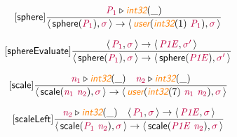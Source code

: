 \documentclass[10pt,leqno,fleqn]{article}
\newcommand{\artVariable}[1]{\mbox{\color{purple}\em #1\/}}
\newcommand{\artConstructor}[1]{\mbox{\sf #1}}
\newcommand{\artSpecial}[1]{\mbox{\color{orange}\sf\em #1}}
\begin{document}
\begin{equation}
\tag*{[\artConstructor{\sf sphere}]}
\begin{split}\frac{ \artVariable{P$_{1}$}\triangleright \artSpecial{int32}(\_) }{\langle\, \artConstructor{\sf sphere}(\artVariable{P$_{1}$}), \artVariable{$\sigma$}\,\rangle \rightarrow \langle\, \artSpecial{user}(\artSpecial{int32}(1)\ \artVariable{P$_{1}$}), \artVariable{$\sigma$}\,\rangle }
\end{split}
\end{equation}

\begin{equation}
\tag*{[\artConstructor{\sf sphereEvaluate}]}
\begin{split}\frac{\langle\, \artVariable{P$_{1}$}, \artVariable{$\sigma$}\,\rangle \rightarrow \langle\, \artVariable{P1E}, \artVariable{$\sigma$\/$^\prime$}\,\rangle }{\langle\, \artConstructor{\sf sphere}(\artVariable{P$_{1}$}), \artVariable{$\sigma$}\,\rangle \rightarrow \langle\, \artConstructor{\sf sphere}(\artVariable{P1E}), \artVariable{$\sigma$\/$^\prime$}\,\rangle }
\end{split}
\end{equation}

\begin{equation}
\tag*{[\artConstructor{\sf scale}]}
\begin{split}\frac{ \artVariable{n$_{1}$}\triangleright \artSpecial{int32}(\_) \quad  \artVariable{n$_{2}$}\triangleright \artSpecial{int32}(\_) }{\langle\, \artConstructor{\sf scale}(\artVariable{n$_{1}$}\ \artVariable{n$_{2}$}), \artVariable{$\sigma$}\,\rangle \rightarrow \langle\, \artSpecial{user}(\artSpecial{int32}(7)\ \artVariable{n$_{1}$}\ \artVariable{n$_{2}$}), \artVariable{$\sigma$}\,\rangle }
\end{split}
\end{equation}

\begin{equation}
\tag*{[\artConstructor{\sf scaleLeft}]}
\begin{split}\frac{ \artVariable{n$_{2}$}\triangleright \artSpecial{int32}(\_) \quad \langle\, \artVariable{P$_{1}$}, \artVariable{$\sigma$}\,\rangle \rightarrow \langle\, \artVariable{P1E}, \artVariable{$\sigma$}\,\rangle }{\langle\, \artConstructor{\sf scale}(\artVariable{P$_{1}$}\ \artVariable{n$_{2}$}), \artVariable{$\sigma$}\,\rangle \rightarrow \langle\, \artConstructor{\sf scale}(\artVariable{P1E}\ \artVariable{n$_{2}$}), \artVariable{$\sigma$}\,\rangle }
\end{split}
\end{equation}
\end{document}
